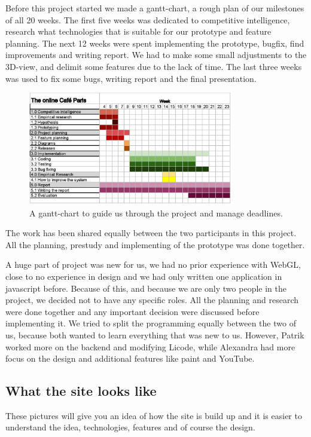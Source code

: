 \documentclass[12pt, titlepage]{article}
\begin{document}
Before this project started we made a gantt-chart, a rough plan of our milestones of all 20 weeks. The first five weeks was dedicated to competitive intelligence, research what technologies that is suitable for our prototype and feature planning. The next 12 weeks were spent implementing the prototype, bugfix, find improvements and writing report. We had to make some small adjustments to the 3D-view, and delimit some features due to the lack of time. The last three weeks was used to fix some bugs, writing report and the final presentation.
\begin{figure}[H]
  \centering
	\includegraphics[width=0.8\textwidth,keepaspectratio]{grovplanering.jpg}
  \caption{A gantt-chart to guide us through the project and manage deadlines.}
\end{figure}
The work has been shared equally between the two participants in this project. All the planning, prestudy and implementing of the prototype was done together.

A huge part of project was new for us, we had no prior experience with WebGL, close to no experience in design and we had only written one application in javascript before. Because of this, and because we are only two people in the project, we decided not to have any specific roles. All the planning and research were done together and any important decision were discussed before implementing it. We tried to split the programming equally between the two of us, because both wanted to learn everything that was new to us. However, Patrik worked more on the backend and modifying Licode, while Alexandra had more focus on the design and additional features like paint and YouTube.
\subsection{What the site looks like}
These pictures will give you an idea of how the site is build up and it is easier to understand the idea, technologies, features and of course the design.
\end{document}
